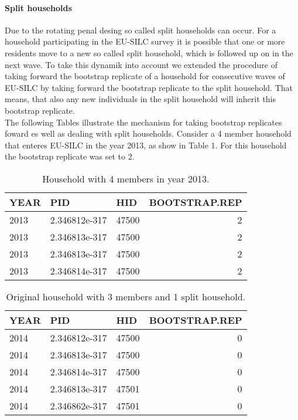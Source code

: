 \documentclass{scrartcl}
\begin{document}
\paragraph{Split households}
Due to the rotating penal desing so called split households can occur. For a household participating in the EU-SILC survey it is possible that one or more residents move to a new so called split household, which is followed up on in the next wave. To take this dynamik into account we extended the procedure of taking forward the bootstrap replicate of a household for consecutive waves of EU-SILC by taking forward the bootstrap replicate to the split household. That means, that also any new individuals in the split household will inherit this bootstrap replicate.\\
\newline
The following Tables illustrate the mechanism for taking bootstrap replicates foward es well as dealing with split households.
Consider a 4 member household that enteres EU-SILC in the year 2013, as show in Table 1. For this household the bootstrap replicate was set to 2.



\begin{table}

\caption{\label{tab:unnamed-chunk-2}Household with 4 members in year 2013.}
\centering
\begin{tabular}[t]{lllr}
\toprule
YEAR & PID & HID & BOOTSTRAP.REP\\
\midrule
2013 & 2.346812e-317 & 47500 & 2\\
2013 & 2.346813e-317 & 47500 & 2\\
2013 & 2.346813e-317 & 47500 & 2\\
2013 & 2.346814e-317 & 47500 & 2\\
\bottomrule
\end{tabular}
\end{table}



\begin{table}

\caption{\label{tab:unnamed-chunk-3}Original household with 3 members and 1 split household.}
\centering
\begin{tabular}[t]{lllr}
\toprule
YEAR & PID & HID & BOOTSTRAP.REP\\
\midrule
2014 & 2.346812e-317 & 47500 & 0\\
2014 & 2.346813e-317 & 47500 & 0\\
2014 & 2.346814e-317 & 47500 & 0\\
2014 & 2.346813e-317 & 47501 & 0\\
2014 & 2.346862e-317 & 47501 & 0\\
\bottomrule
\end{tabular}
\end{table}
\end{document}
